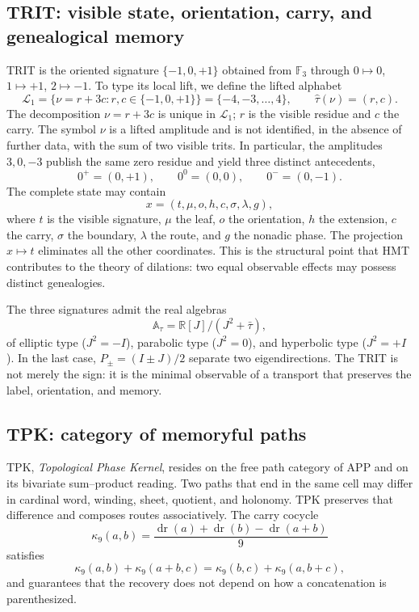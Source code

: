 \subsection{TRIT: visible state, orientation, carry, and genealogical memory}

TRIT is the oriented signature $\{-1,0,+1\}$ obtained from $\mathbb F_3$ through
$0\mapsto0$, $1\mapsto+1$, $2\mapsto-1$. To type its local lift,
we define the lifted alphabet
\[
 \mathcal L_1=\{\nu=r+3c:r,c\in\{-1,0,+1\}\}
 =\{-4,-3,\ldots,4\},
 \qquad
 \widehat\tau(\nu)=(r,c).
 \tag{GMC-2.7}
\]
The decomposition $\nu=r+3c$ is unique in $\mathcal L_1$; $r$ is the visible
residue and $c$ the carry. The symbol $\nu$ is a lifted amplitude and is not
identified, in the absence of further data, with the sum of two visible trits. In particular,
the amplitudes $3,0,-3$ publish the same zero residue and yield three distinct
antecedents,
\[
 0^+=(0,+1),\qquad 0^0=(0,0),\qquad0^-=(0,-1).
 \tag{GMC-2.8}
\]
The complete state may contain
\[
 x=(t,\mu,o,h,c,\sigma,\lambda,g),
 \tag{GMC-2.9}
\]
where $t$ is the visible signature, $\mu$ the leaf, $o$ the orientation, $h$ the
extension, $c$ the carry, $\sigma$ the boundary, $\lambda$ the route, and $g$ the
nonadic phase. The projection $x\mapsto t$ eliminates all the other
coordinates. This is the structural point that HMT contributes to the theory of
dilations: two equal observable effects may possess distinct
genealogies.

The three signatures admit the real algebras
\[
 \mathbb A_\tau=\mathbb R[J]/(J^2+\bar\tau),
\]
of elliptic type ($J^2=-I$), parabolic type ($J^2=0$), and hyperbolic type
($J^2=+I$). In the last case, $P_\pm=(I\pm J)/2$ separate two eigendirections.
The TRIT is not merely the sign: it is the minimal observable of a transport
that preserves the label, orientation, and memory.

\subsection{TPK: category of memoryful paths}

TPK, \emph{Topological Phase Kernel}, resides on the free path category of APP and on its bivariate sum--product reading. Two paths that end in the same cell may differ in cardinal word, winding, sheet, quotient, and holonomy. TPK preserves that difference and composes routes associatively. The carry cocycle
\[
 \kappa_9(a,b)=
 \frac{\operatorname{dr}(a)+\operatorname{dr}(b)
       -\operatorname{dr}(a+b)}9
\]
satisfies
\[
 \kappa_9(a,b)+\kappa_9(a+b,c)
 =\kappa_9(b,c)+\kappa_9(a,b+c),
 \tag{GMC-2.10}
\]
and guarantees that the recovery does not depend on how a concatenation is parenthesized.

